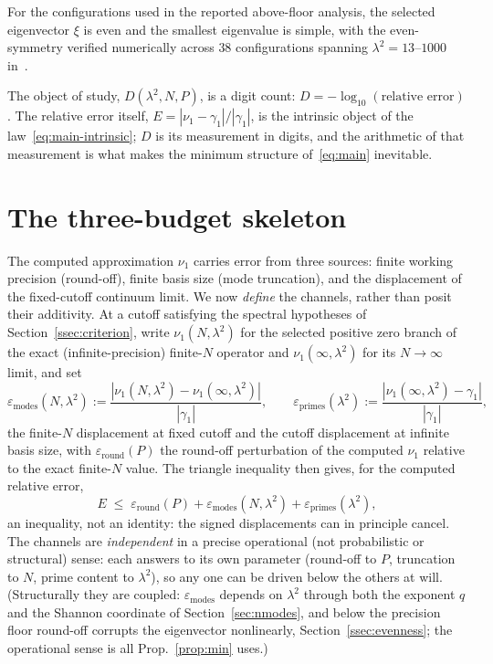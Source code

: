 \documentclass[11pt,a4paper]{article}
\begin{document}
For the configurations used in the reported above-floor analysis, the selected
eigenvector $\xi$ is even and the smallest eigenvalue is simple, with the
even-symmetry verified
numerically across $38$ configurations spanning $\lambda^2=13$--$1000$
in~\cite{AndrewsA}.

The object of study, $D(\lambda^2,N,P)$, is a digit count: $D=-\log_{10}
(\text{relative error})$. The relative error itself,
$E=|\nu_1-\gamma_1|/|\gamma_1|$, is the intrinsic object of the
law~\eqref{eq:main-intrinsic}; $D$ is its measurement in digits, and the
arithmetic of that measurement is what makes the minimum structure
of~\eqref{eq:main} inevitable.

\section{The three-budget skeleton}\label{sec:skeleton}

The computed approximation $\nu_1$ carries error from three sources:
finite working precision (round-off), finite basis size (mode truncation), and
the displacement of the fixed-cutoff continuum limit. We now \emph{define} the
channels, rather than posit their additivity. At a cutoff satisfying the
spectral hypotheses of Section~\ref{ssec:criterion}, write
$\nu_1(N,\lambda^2)$ for the selected positive zero branch of the exact
(infinite-precision) finite-$N$ operator and
$\nu_1(\infty,\lambda^2)$ for its $N\to\infty$ limit, and set
\begin{equation}\label{eq:channels}
  \varepsilon_{\mathrm{modes}}(N,\lambda^2)
   :=\frac{|\nu_1(N,\lambda^2)-\nu_1(\infty,\lambda^2)|}{|\gamma_1|},
  \qquad
  \varepsilon_{\mathrm{primes}}(\lambda^2)
   :=\frac{|\nu_1(\infty,\lambda^2)-\gamma_1|}{|\gamma_1|},
\end{equation}
the finite-$N$ displacement at fixed cutoff and the cutoff displacement at
infinite basis size, with $\varepsilon_{\mathrm{round}}(P)$ the round-off
perturbation of the computed $\nu_1$ relative to the exact finite-$N$ value.
The triangle inequality then gives, for the computed relative error,
\[
  E \;\le\; \varepsilon_{\mathrm{round}}(P)
  +\varepsilon_{\mathrm{modes}}(N,\lambda^2)+\varepsilon_{\mathrm{primes}}(\lambda^2),
\]
an inequality, not an identity: the signed displacements can in principle
cancel. The channels are \emph{independent} in a precise operational (not
probabilistic or structural) sense: each answers to its own parameter
(round-off to $P$, truncation to $N$, prime content to $\lambda^2$), so any
one can be driven below the others at will. (Structurally they are coupled:
$\varepsilon_{\mathrm{modes}}$ depends on $\lambda^2$ through both the exponent
$q$ and the Shannon coordinate of Section~\ref{sec:nmodes}, and below the
precision floor round-off corrupts the eigenvector nonlinearly,
Section~\ref{ssec:evenness}; the operational sense is all
Prop.~\ref{prop:min} uses.)
\end{document}
